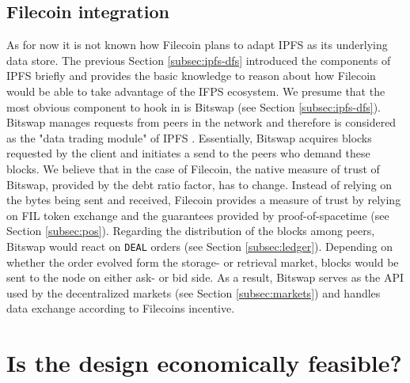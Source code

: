 \documentclass[conference]{IEEEtran}
\begin{document}
\subsection{Filecoin integration}
As for now it is not known how Filecoin plans to adapt IPFS as its underlying data store.
The previous Section \ref{subsec:ipfs-dfs} introduced the components of IPFS briefly and provides the basic knowledge to reason about how Filecoin would be able to take advantage of the IFPS ecosystem.
We presume that the most obvious component to hook in is Bitswap (see Section \ref{subsec:ipfs-dfs}).
Bitswap manages requests from peers in the network and therefore is considered as the "data trading module" of IPFS \cite{bitswap}.
Essentially, Bitswap acquires blocks requested by the client and initiates a send to the peers who demand these blocks.
We believe that in the case of Filecoin, the native measure of trust of Bitswap, provided by the debt ratio factor, has to change.
Instead of relying on the bytes being sent and received, Filecoin provides a measure of trust by relying on FIL token exchange and the guarantees provided by proof-of-spacetime (see Section \ref{subsec:pos}).
Regarding the distribution of the blocks among peers, Bitswap would react on \texttt{DEAL} orders (see Section \ref{subsec:ledger}).
Depending on whether the order evolved form the storage- or retrieval market, blocks would be sent to the node on either ask- or bid side.
As a result, Bitswap serves as the API used by the decentralized markets (see Section \ref{subsec:markets}) and handles data exchange according to Filecoins incentive.

\section{Is the design economically feasible?}
\label{sec:eco-feasibility}
\end{document}
